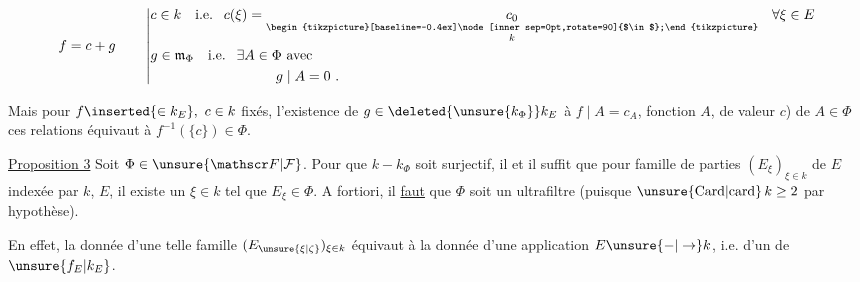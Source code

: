 \[
 f=c+g\qquad\left|\begin{aligned}
 &c\in k\quad\text{i.e. }\ c(\xi)=\underset{\substack{\begin{tikzpicture}[baseline=-0.4ex]\node[inner sep=0pt,rotate=90]{$\in$};\end{tikzpicture}\\ k}}{c_0}\quad\forall\xi\in E\\
 &g\in\mathfrak m_\Phi\quad\text{i.e. }\ \exists A\in\Phi\ \text{avec}\\
 &\hspace{9em} g\mid A=0\ .
 \end{aligned}\right.
\]

Mais pour $f\inserted{\in k_E},\ c\in k$  fixés, l'existence de $g\in \deleted{\unsure{k_\Phi}} k_E$     à  $f\mid A=c_A$, \unsure{(}fonction   $A$, de valeur $c$)   de $A\in\Phi$   ces relations équivaut à $f^{-1}(\{c\})\in\Phi$.


\uline{Proposition 3} Soit  $\Phi\in\unsure{\mathscr F|\mathcal F}$. Pour que $k\mathrel{-}k_\Phi$ soit surjectif, il  et il suffit que pour  famille de parties  $(E_\xi)_{\xi\in k}$ de $E$ indexée par $k$,   $E$,  il existe un $\xi\in k$ tel que $E_\xi\in\Phi$. A fortiori, il \uline{faut} que $\Phi$ soit un ultrafiltre (puisque $\unsure{\mathrm{Card}|\mathrm{card}}\,k\geq2$ par hypothèse).



En effet, la donnée d'une telle famille $(E_{\unsure{\xi|\zeta}})_{\xi\in k}$ équivaut à la donnée d'une application $E\unsure{-|\to}k$, i.e. d'un  de $\unsure{f_E|k_E}$. 


